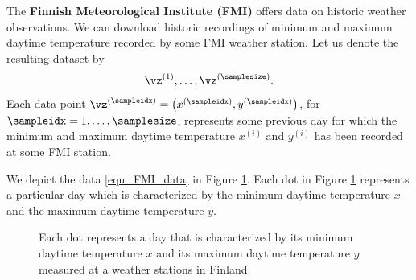 \documentclass[12pt]{report}
\begin{document}
The {\bf Finnish Meteorological Institute (FMI)} offers data 
on historic weather observations. We can download historic 
recordings of minimum and maximum daytime temperature 
recorded by some FMI weather station. Let us denote the 
resulting dataset by 
\begin{equation}
\label{equ_FMI_data}
\vz^{(1)},\ldots,\vz^{(\samplesize)}.  
\end{equation} 
Each data point $\vz^{(\sampleidx)} = \big(x^{(\sampleidx)},y^{(\sampleidx)}\big)$, 
for $\sampleidx=1,\ldots,\samplesize$, represents some previous 
day for which the minimum and maximum daytime temperature 
$x^{(i)}$ and $y^{(i)}$ has been recorded at some FMI station.  %

We depict the data \eqref{equ_FMI_data} in Figure \ref{fig_scatterplot_temp_FMI}.  
Each dot in Figure \ref{fig_scatterplot_temp_FMI} represents a 
particular day which is characterized by the minimum daytime 
temperature $x$ and the maximum daytime temperature $y$. 

\begin{figure}[htbp]
	\begin{center}
		\vspace*{-14mm}
	\end{center}
	\caption{Each dot represents a day that is characterized 
		by its minimum daytime temperature $x$ and its maximum 
		daytime temperature $y$ measured at a weather stations in Finland.}
	\label{fig_scatterplot_temp_FMI}
	\vspace*{-3mm}
\end{figure}
\end{document}
